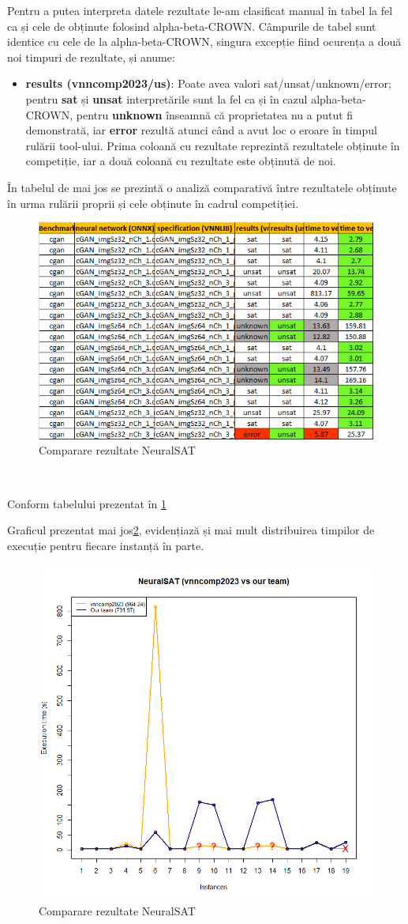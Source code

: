 Pentru a putea interpreta datele rezultate le-am clasificat manual în tabel la fel ca și cele de obținute folosind alpha-beta-CROWN. Câmpurile de tabel sunt identice cu cele de la alpha-beta-CROWN, singura excepție fiind ocurența a două noi timpuri de rezultate, și anume:
\begin{itemize}
    \item \textbf{results (vnncomp2023/us)}: Poate avea valori sat/unsat/unknown/error; pentru \textbf{sat} și \textbf{unsat} interpretările sunt la fel ca și în cazul alpha-beta-CROWN, pentru \textbf{unknown} înseamnă că proprietatea nu a putut fi demonstrată, iar \textbf{error} rezultă atunci când a avut loc o eroare în timpul rulării tool-ului.
    Prima coloană cu rezultate reprezintă rezultatele obținute în competiție, iar a două coloană cu rezultate este obținută de noi.
\end{itemize}

În tabelul de mai jos se prezintă o analiză comparativă între rezultatele obținute în urma rulării proprii și cele obținute în cadrul competiției.

\begin{figure}[h]
\centering 
\includegraphics[width=0.8\linewidth]{imagini/interpretare rezultate/NeuralSAT_comp_vs_us.png}
\caption{Comparare rezultate NeuralSAT}
\label{fig:image2} 
\end{figure}
\

Conform tabelului prezentat în \ref{fig:image2}

Graficul prezentat mai jos\ref{fig:image4}, evidențiază și mai mult distribuirea timpilor de execuție pentru fiecare instanță în parte.

\begin{figure}[h]
\centering 
\includegraphics[width=0.8\linewidth]{imagini/interpretare rezultate/NeuralSAT_us_vs_vnncomp2023.png}
\caption{Comparare rezultate NeuralSAT}
\label{fig:image4} 
\end{figure}
\